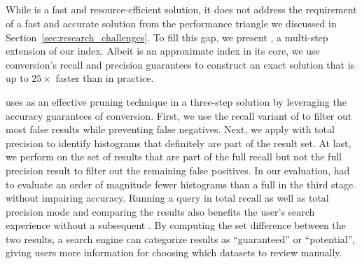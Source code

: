 \vspace{-0.3em}
\subsection{\exact{}}
\label{sec:exact_query}

While \approximate{} is a fast and resource-efficient solution, it does not address the requirement of a fast and accurate solution from the performance triangle we discussed in Section~\ref{sec:research_challenges}.
To fill this gap, we present \exact{}, a multi-step extension of our index.
Albeit \system{} is an approximate index in its core, we use conversion's recall and precision guarantees to construct an exact solution that is up to $25\times$ faster than \pscan in practice.

\exact{} uses \approximate{} as an effective pruning technique in a three-step solution by leveraging the accuracy guarantees of conversion.
First, we use the recall variant of \approximate{} to filter out most false results while preventing false negatives.
Next, we apply \system{} with total precision to identify histograms that definitely are part of the result set.
At last, we perform \pscan on the set of results that are part of the full recall but not the full precision result to filter out the remaining false positives.
In our evaluation, \exact{} had to evaluate an order of magnitude fewer histograms than a full \pscan in the third stage without impairing accuracy.
Running a query in total recall as well as total precision mode and comparing the results also benefits the user's search experience without a subsequent \pscan.
By computing the set difference between the two results, a search engine can categorize results as ``guaranteed'' or ``potential'', giving users more information for choosing which datasets to review manually.
